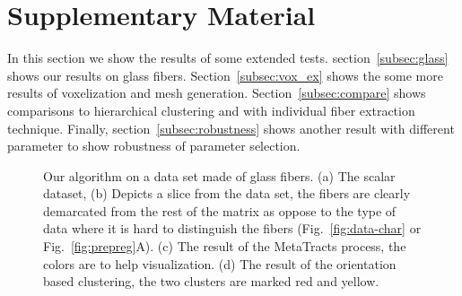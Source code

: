 \pagebreak
\clearpage
\section{Supplementary Material}
\label{sec:sm}
 In this section we show the results of some extended tests.
 section~\ref{subsec:glass} shows our results on glass fibers. Section~\ref{subsec:vox_ex} shows the some more results of voxelization and mesh generation. Section~\ref{subsec:compare} shows comparisons to hierarchical clustering and with individual fiber extraction technique. Finally, section~\ref{subsec:robustness} shows another result with different parameter to show robustness of parameter selection.
 
\begin{figure}
\centering
{}
  \caption{Our algorithm on a data set made of glass fibers. (a) The scalar dataset, (b) Depicts a slice from the data set, the  fibers are clearly demarcated from the rest of the matrix as oppose to the type of data  where it is hard to distinguish the fibers (Fig.~\ref{fig:data-char} or Fig.~\ref{fig:prepreg}A). (c) The result of the MetaTracts process, the colors are to help visualization. (d) The result of the orientation based clustering, the two clusters are marked red and yellow.}\label{fig:glass}
\end{figure}
